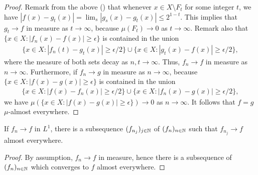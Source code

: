 \begin{proof}
    Remark from the above () that whenever $x\in X\setminus F_t$ for some integer $t$, we have $|f(x)-g_t(x)|=\lim_s |g_s(x)-g_t(x)|\leq 2^{1-t}$.
    This implies that $g_t\rightarrow f$ in measure as $t\rightarrow\infty$, because $\mu(F_t)\rightarrow 0$ as $t\rightarrow\infty$.
    Remark also that $\{x\in X: |f_n(x)-f(x)|\geq \epsilon\}$ is contained in the union
    \begin{align*}
        \{x\in X: |f_n(t)-g_t(x)|\geq \epsilon/2\}
        \cup
        \{x\in X: |g_t(x)-f(x)|\geq \epsilon/2\},
    \end{align*}
    where the measure of both sets decay as $n, t\rightarrow\infty$.
    Thus, $f_n\rightarrow f$ in measure as $n\rightarrow\infty$.
    Furthermore, if $f_n\rightarrow g$ in measure as $n\rightarrow\infty$, because $\{x\in X: |f(x)-g(x)|\geq\epsilon\}$ is contained in the union
    \begin{align*}
        \{x\in X: |f(x)-f_n(x)|\geq\epsilon/2\}
        \cup
        \{x\in X: |f_n(x)-g(x)|\geq\epsilon/2\},
    \end{align*}
    we have $\mu(\{x\in X: |f(x)-g(x)|\geq\epsilon\})\rightarrow 0$ as $n\rightarrow\infty$.
    It follows that $f=g$ $\mu$-almost everywhere.
\end{proof}

\begin{cor}
    If $f_n\rightarrow f$ in $L^1$, there is a subsequence $(f_{n_j})_{j\in{\mathbb{N}}}$ of $(f_n)_{n\in{\mathbb{N}}}$ such that $f_{n_j}\rightarrow f$ almost everywhere.
\end{cor}
\begin{proof} 
    By assumption, $f_n\rightarrow f$ in measure, hence there is a subsequence of $(f_n)_{n\in{\mathbb{N}}}$ which converges to $f$ almost everywhere.
\end{proof}

